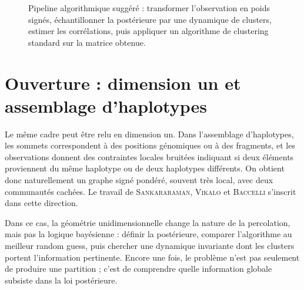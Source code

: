 \begin{figure}[H]
\centering
{}
\caption{Pipeline algorithmique suggéré : transformer l'observation en poids signés, échantillonner la postérieure par une dynamique de clusters, estimer les corrélations, puis appliquer un algorithme de clustering standard sur la matrice obtenue.}
\label{fig:chapII_pipeline_algo}
\end{figure}

\section{Ouverture : dimension un et assemblage d'haplotypes}
\label{sec:chapII_haplotypes}

Le même cadre peut être relu en dimension un. Dans l'assemblage d'haplotypes, les sommets correspondent à des positions génomiques ou à des fragments, et les observations donnent des contraintes locales bruitées indiquant si deux éléments proviennent du même haplotype ou de deux haplotypes différents. On obtient donc naturellement un graphe signé pondéré, souvent très local, avec deux communautés cachées. Le travail de \textsc{Sankararaman}, \textsc{Vikalo} et \textsc{Baccelli} \cite{SankararamanVikaloBaccelli2020} s'inscrit dans cette direction.

Dans ce cas, la géométrie unidimensionnelle change la nature de la percolation, mais pas la logique bayésienne : définir la postérieure, comparer l'algorithme au meilleur random guess, puis chercher une dynamique invariante dont les clusters portent l'information pertinente. Encore une fois, le problème n'est pas seulement de produire une partition ; c'est de comprendre quelle information globale subsiste dans la loi postérieure.

